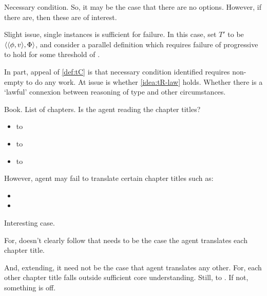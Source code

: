 \begin{note}
  Necessary condition.
  So, it may be the case that there are no options.
  However, if there are, then these are of interest.
\end{note}

\begin{note}
  Slight issue, single instances is sufficient for failure.
  In this case, set \(T'\) to be \(\langle \langle \phi, v \rangle, \Phi \rangle\), and consider a parallel definition which requires failure of progressive to hold for some threshold of \tI{}.

  In part, appeal of \autoref{def:tC} is that necessary condition identified requires non-empty \tRep{} to do any work.
  At issue is whether \autoref{idea:tR-law} holds.
  Whether there is a `lawful' connexion between reasoning of type and other circumstances.
\end{note}

\begin{note}
  \begin{illustration}[Translation]
    Book.
    List of chapters.
    Is the agent reading the chapter titles?

    \begin{itemize}
    \item
       to 
    \item
       to 
    \item
       to 
    \end{itemize}
    However, agent may fail to translate certain chapter titles such as:
    \begin{itemize}
    \item
    \item
    \end{itemize}
  \end{illustration}

  Interesting case.

  For, doesn't clearly follow that needs to be the case the agent translates each chapter title.

  And, extending, it need not be the case that agent translates any other.
  For, each other chapter title falls outside sufficient core understanding.
  Still,  to .
  If not, something is off.
\end{note}

